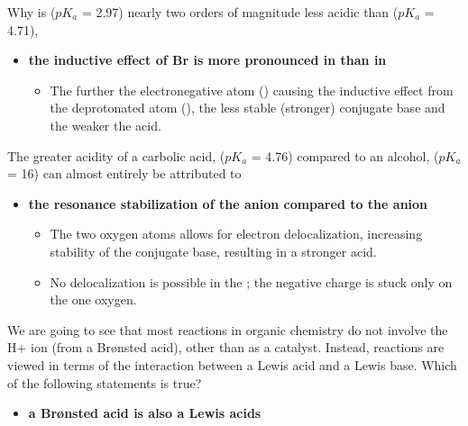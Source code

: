 \documentclass[12pt,a4paper]{article}
\begin{document}
\begin{enumerate}
\begin{itemize}
\begin{itemize}
                \end{itemize}
        \end{itemize}
    {\color{G-Moon}\item Why is  (\(pK_a\) = 2.97) nearly two orders of magnitude less acidic than  (\(pK_a\) = 4.71),  }
        \begin{itemize}
            \item {\color{o-Sun}\textbf{the inductive effect of Br is more pronounced in  than in }}
                \begin{itemize}
                    \item The further the electronegative atom () causing the inductive effect from the deprotonated atom (), the less stable (stronger) conjugate base and the weaker the acid. 
                \end{itemize}
        \end{itemize}
    {\color{G-Moon}\item The greater acidity of a carbolic acid,  (\(pK_a\) = 4.76) compared to an alcohol,  (\(pK_a\) = 16) can almost entirely be attributed to}
        \begin{itemize}
            \item {\color{o-Sun}\textbf{the resonance stabilization of the  anion compared to the  anion}}
                \begin{itemize}
                    \item The two oxygen atoms allows for electron delocalization, increasing stability of the conjugate base, resulting in a stronger acid.
                    \item No delocalization is possible in the ; the negative charge is stuck only on the one oxygen.
                \end{itemize}
        \end{itemize}
    {\color{G-Moon}\item We are going to see that most reactions in organic chemistry do not involve the H+ ion (from a Br{\o}nsted acid), other than as a catalyst.  Instead, reactions are viewed in terms of the interaction between a Lewis acid and a Lewis base.  Which of the following statements is true?}
        \begin{itemize}
            \item {\color{o-Sun}\textbf{a Br{\o}nsted acid is also a Lewis acids}}
                \begin{itemize}

\end{itemize}
\end{itemize}
\end{enumerate}
\end{document}
